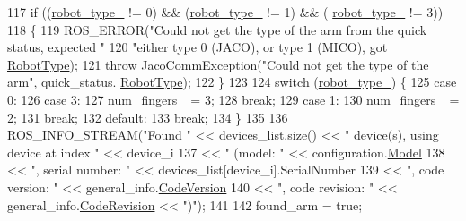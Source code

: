 \begin{DoxyCode}
117             \textcolor{keywordflow}{if} ((\hyperlink{classjaco_1_1JacoComm_afb603f289e6ed8855cbeb0d0b1400829}{robot\_type\_} != 0) && (\hyperlink{classjaco_1_1JacoComm_afb603f289e6ed8855cbeb0d0b1400829}{robot\_type\_} != 1) && (
      \hyperlink{classjaco_1_1JacoComm_afb603f289e6ed8855cbeb0d0b1400829}{robot\_type\_} != 3))
118             \{
119                 ROS\_ERROR(\textcolor{stringliteral}{"Could not get the type of the arm from the quick status, expected "}
120                           \textcolor{stringliteral}{"either type 0 (JACO), or type 1 (MICO), got %
      \hyperlink{KinovaTypes_8h_a74b2c900b935a07df18fbea12c3f4d68}{RobotType});
121                 \textcolor{keywordflow}{throw} JacoCommException(\textcolor{stringliteral}{"Could not get the type of the arm"}, quick\_status.
      \hyperlink{KinovaTypes_8h_a74b2c900b935a07df18fbea12c3f4d68}{RobotType});
122             \}
123 
124             \textcolor{keywordflow}{switch} (\hyperlink{classjaco_1_1JacoComm_afb603f289e6ed8855cbeb0d0b1400829}{robot\_type\_}) \{
125                 \textcolor{keywordflow}{case} 0:
126                 \textcolor{keywordflow}{case} 3:
127                     \hyperlink{classjaco_1_1JacoComm_a5812c7504d90ec6016c40cba097ba1bb}{num\_fingers\_} = 3;
128                     \textcolor{keywordflow}{break};
129                 \textcolor{keywordflow}{case} 1:
130                     \hyperlink{classjaco_1_1JacoComm_a5812c7504d90ec6016c40cba097ba1bb}{num\_fingers\_} = 2;
131                     \textcolor{keywordflow}{break};
132                 \textcolor{keywordflow}{default}:
133                     \textcolor{keywordflow}{break};
134             \}
135 
136             ROS\_INFO\_STREAM(\textcolor{stringliteral}{"Found "} << devices\_list.size() << \textcolor{stringliteral}{" device(s), using device at index "} << 
      device\_i
137                             << \textcolor{stringliteral}{" (model: "} << configuration.\hyperlink{KinovaTypes_8h_a5bb86440679384635d0d0f41ca431249}{Model}
138                             << \textcolor{stringliteral}{", serial number: "} << devices\_list[device\_i].SerialNumber
139                             << \textcolor{stringliteral}{", code version: "} << general\_info.\hyperlink{KinovaTypes_8h_ac71288477c2e447e7dd298ca707bcec3}{CodeVersion}
140                             << \textcolor{stringliteral}{", code revision: "} << general\_info.\hyperlink{KinovaTypes_8h_a56f6f5dc8067f0ea4deb4b0c5cc3f971}{CodeRevision} << \textcolor{stringliteral}{")"});
141 
142             found\_arm = \textcolor{keyword}{true};
}
\end{DoxyCode}
